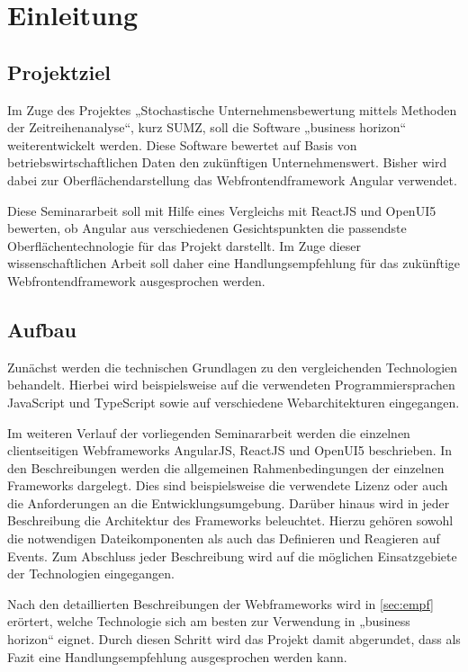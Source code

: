 
\chapter{Einleitung}

\section{Projektziel}

Im Zuge des Projektes „Stochastische Unternehmensbewertung mittels Methoden der Zeitreihenanalyse“, kurz SUMZ, soll die Software „business horizon“ weiterentwickelt werden. Diese Software bewertet auf Basis von betriebswirtschaftlichen Daten den zukünftigen Unternehmenswert. Bisher wird dabei zur Oberflächendarstellung das Webfrontendframework Angular verwendet.

Diese Seminararbeit soll mit Hilfe eines Vergleichs mit ReactJS und OpenUI5 bewerten, ob Angular aus verschiedenen Gesichtspunkten die passendste Oberflächentechnologie für das Projekt darstellt. Im Zuge dieser wissenschaftlichen Arbeit soll daher eine Handlungsempfehlung für das zukünftige Webfrontendframework ausgesprochen werden.

\section{Aufbau}

Zunächst werden die technischen Grundlagen zu den vergleichenden Technologien behandelt. Hierbei wird beispielsweise auf die verwendeten Programmiersprachen JavaScript und TypeScript sowie auf verschiedene Webarchitekturen eingegangen. 

Im weiteren Verlauf der vorliegenden Seminararbeit werden die einzelnen clientseitigen Webframeworks AngularJS, ReactJS und OpenUI5 beschrieben. In den Beschreibungen werden die allgemeinen Rahmenbedingungen der einzelnen Frameworks dargelegt. Dies sind beispielsweise die verwendete Lizenz oder auch die Anforderungen an die Entwicklungsumgebung. Darüber hinaus wird in jeder Beschreibung die Architektur des Frameworks beleuchtet. Hierzu gehören sowohl die notwendigen Dateikomponenten als auch das Definieren und Reagieren auf Events. Zum Abschluss jeder Beschreibung wird auf die möglichen Einsatzgebiete der Technologien eingegangen.

Nach den detaillierten Beschreibungen der Webframeworks wird in \autoref{sec:empf} erörtert, welche Technologie sich am besten zur Verwendung in „business horizon“ eignet. Durch diesen Schritt wird das Projekt damit abgerundet, dass als Fazit eine Handlungsempfehlung ausgesprochen werden kann.